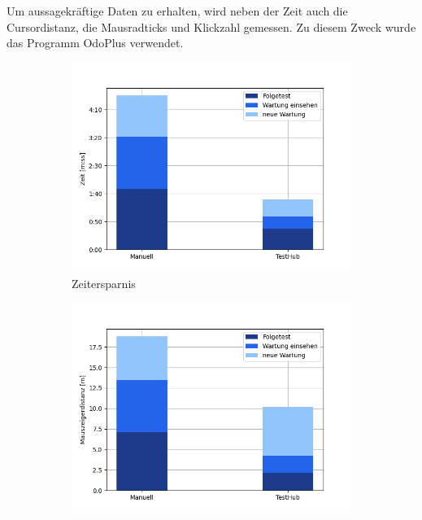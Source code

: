Um aussagekräftige Daten zu erhalten, wird neben der Zeit auch die Cursordistanz,
die Mausradticks und Klickzahl gemessen. Zu diesem Zweck wurde das Programm OdoPlus
verwendet.

\begin{figure}[H]
    \centering
    \begin{subfigure}{.5\textwidth}
      \centering
      \includegraphics[width=\linewidth]{speedtests/validierung_Zeit.png}
      \caption{Zeitersparnis}
    \end{subfigure}%
    \begin{subfigure}{.5\textwidth}
      \centering
      \includegraphics[width=\linewidth]{speedtests/validierung_cursordistanz.png}

\end{subfigure}
\end{figure}
